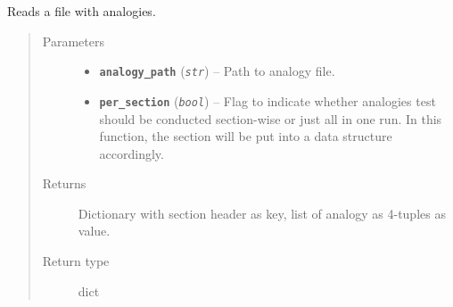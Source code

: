 \documentclass[letterpaper,10pt,english]{sphinxmanual}
\begin{document}

\begin{fulllineitems}
\label{src.eval:src.eval.analogy.read_analogies}
Reads a file with analogies.
\begin{quote}\begin{description}
\item[{Parameters}] \leavevmode\begin{itemize}
\item {} 
\textbf{\texttt{analogy\_path}} (\emph{\texttt{str}}) -- Path to analogy file.

\item {} 
\textbf{\texttt{per\_section}} (\emph{\texttt{bool}}) -- Flag to indicate whether analogies test should be conducted section-wise or just all in
one run. In this function, the section will be put into a data structure accordingly.

\end{itemize}

\item[{Returns}] \leavevmode
Dictionary with section header as key, list of analogy as 4-tuples as value.

\item[{Return type}] \leavevmode
dict

\end{description}\end{quote}

\end{fulllineitems}
\end{document}
